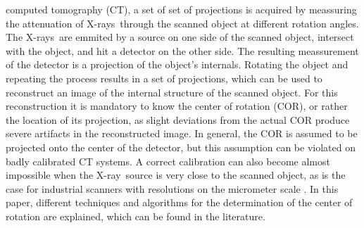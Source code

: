 \documentclass[10pt,journal,compsoc]{IEEEtran}
\newcommand{\xray}{X-ray~}
\newcommand{\xrays}{X-rays~}
\begin{document}
% 
% 
% 
% 
 computed tomography (CT), a set of set of projections is acquired by meassuring the attenuation of \xrays through the scanned object at different rotation angles.
The \xrays are emmited by a source on one side of the scanned object, intersect with the object, and hit a detector on the other side.
The resulting meassurement of the detector is a projection of the object's internals.
Rotating the object and repeating the process results in a set of projections, which can be used to reconstruct an image of the internal structure of the scanned object. 
For this reconstruction it is mandatory to know the center of rotation (COR), or rather the location of its projection, as slight deviations from the actual COR produce severe artifacts in the reconstructed image.
In general, the COR is assumed to be projected onto the center of the detector, but this assumption can be violated on badly calibrated CT systems. 
A correct calibration can also become almost impossible when the \xray source is very close to the scanned object, as is the case for industrial scanners with resolutions on the micrometer scale \cite{azevedo90}.
In this paper, different techniques and algorithms for the determination of the center of rotation are explained, which can be found in the literature.


%
%
\end{document}
